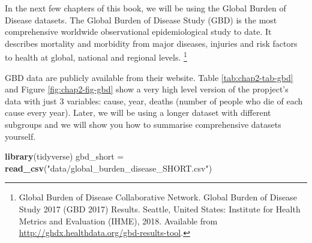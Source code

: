 \documentclass[12pt,]{krantz}
\makeatletter
\newenvironment{Shaded}{\begin{snugshade}}{\end{snugshade}}
\newcommand{\KeywordTok}[1]{\textcolor[rgb]{0.13,0.29,0.53}{\textbf{#1}}}
\newcommand{\NormalTok}[1]{#1}
\newcommand{\StringTok}[1]{\textcolor[rgb]{0.31,0.60,0.02}{#1}}
\newenvironment{kframe}{%
\medskip{}
\setlength{\fboxsep}{.8em}
 \def\at@end@of@kframe{}%
 \ifinner\ifhmode%
  \def\at@end@of@kframe{\end{minipage}}%
  \begin{minipage}{\columnwidth}%
 \fi\fi%
 \def\FrameCommand##1{\hskip\@totalleftmargin \hskip-\fboxsep
 \colorbox{shadecolor}{##1}\hskip-\fboxsep
     \hskip-\linewidth \hskip-\@totalleftmargin \hskip\columnwidth}%
 \MakeFramed {\advance\hsize-\width
   \@totalleftmargin\z@ \linewidth\hsize
   \@setminipage}}%
 {\par\unskip\endMakeFramed%
 \at@end@of@kframe}
\renewenvironment{Shaded}{\begin{kframe}}{\end{kframe}}
\theoremstyle{definition}
\theoremstyle{definition}
\theoremstyle{definition}
\theoremstyle{remark}
\makeatother
\begin{document}
In the next few chapters of this book, we will be using the Global
Burden of Disease datasets. The Global Burden of Disease Study (GBD) is
the most comprehensive worldwide observational epidemiological study to
date. It describes mortality and morbidity from major diseases, injuries
and risk factors to health at global, national and regional levels.
\footnote{Global Burden of Disease Collaborative Network. Global Burden
  of Disease Study 2017 (GBD 2017) Results. Seattle, United States:
  Institute for Health Metrics and Evaluation (IHME), 2018. Available
  from \url{http://ghdx.healthdata.org/gbd-results-tool}.}

GBD data are publicly available from their website. Table
\ref{tab:chap2-tab-gbd} and Figure \ref{fig:chap2-fig-gbd} show a very
high level version of the propject's data with just 3 variables: cause,
year, deaths (number of people who die of each cause every year). Later,
we will be using a longer dataset with different subgroups and we will
show you how to summarise comprehensive datasets yourself.

\begin{Shaded}
\begin{Highlighting}[]
\KeywordTok{library}\NormalTok{(tidyverse)}
\NormalTok{gbd_short =}\StringTok{ }\KeywordTok{read_csv}\NormalTok{(}\StringTok{"data/global_burden_disease_SHORT.csv"}\NormalTok{)}
\end{Highlighting}
\end{Shaded}
\end{document}
